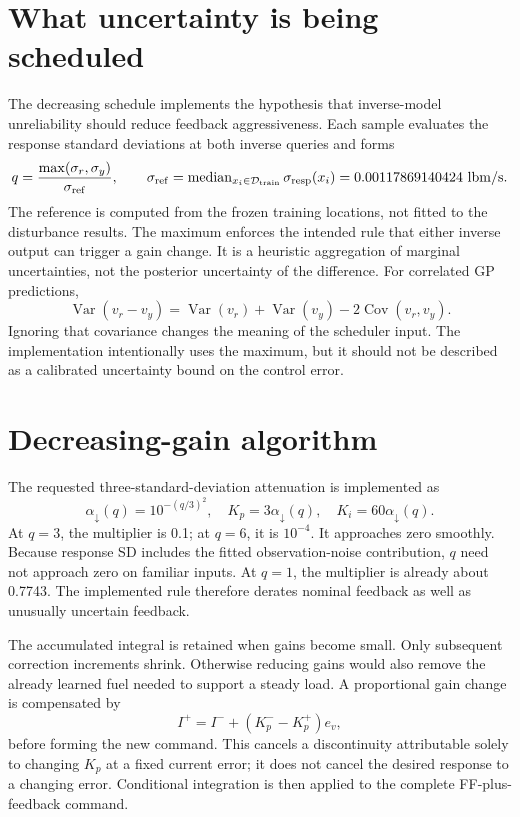 \section{What uncertainty is being scheduled}
The decreasing schedule implements the hypothesis that inverse-model unreliability should reduce feedback aggressiveness. Each sample evaluates the response standard deviations at both inverse queries and forms
\begin{equation}
q=\frac{\max(\sigma_r,\sigma_y)}{\sigma_{\rm ref}},\qquad
\sigma_{\rm ref}=\operatorname{median}_{x_i\in\mathcal D_{\rm train}}\sigma_{\rm resp}(x_i)
=0.00117869140424\ \mathrm{lbm/s}.
\end{equation}
The reference is computed from the frozen training locations, not fitted to the disturbance results. The maximum enforces the intended rule that either inverse output can trigger a gain change. It is a heuristic aggregation of marginal uncertainties, not the posterior uncertainty of the difference. For correlated GP predictions,
\begin{equation}
\operatorname{Var}(v_r-v_y)=\operatorname{Var}(v_r)+\operatorname{Var}(v_y)-2\operatorname{Cov}(v_r,v_y).
\end{equation}
Ignoring that covariance changes the meaning of the scheduler input. The implementation intentionally uses the maximum, but it should not be described as a calibrated uncertainty bound on the control error.

\section{Decreasing-gain algorithm}
The requested three-standard-deviation attenuation is implemented as
\begin{equation}
\alpha_\downarrow(q)=10^{-(q/3)^2},\quad
K_p=3\alpha_\downarrow(q),\quad K_i=60\alpha_\downarrow(q).
\label{eq:down}
\end{equation}
At $q=3$, the multiplier is 0.1; at $q=6$, it is $10^{-4}$. It approaches zero smoothly. Because response SD includes the fitted observation-noise contribution, $q$ need not approach zero on familiar inputs. At $q=1$, the multiplier is already about 0.7743. The implemented rule therefore derates nominal feedback as well as unusually uncertain feedback.

The accumulated integral is retained when gains become small. Only subsequent correction increments shrink. Otherwise reducing gains would also remove the already learned fuel needed to support a steady load. A proportional gain change is compensated by
\begin{equation}
I^{+}=I^{-}+(K_p^{-}-K_p^{+})e_v,
\end{equation}
before forming the new command. This cancels a discontinuity attributable solely to changing $K_p$ at a fixed current error; it does not cancel the desired response to a changing error. Conditional integration is then applied to the complete FF-plus-feedback command.

